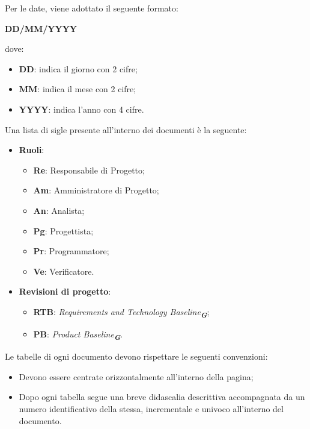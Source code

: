 Per le date, viene adottato il seguente formato:
\begin{center}
    \textbf{DD/MM/YYYY}
\end{center}
dove:
\begin{itemize}
    \item \textbf{DD}: indica il giorno con 2 cifre;
    \item \textbf{MM}: indica il mese con 2 cifre;
    \item \textbf{YYYY}: indica l’anno con 4 cifre.
\end{itemize}

Una lista di sigle presente all'interno dei documenti è la seguente:
\begin{itemize}
    \item \textbf{Ruoli}:
    \begin{itemize}
        \item \textbf{Re}: Responsabile di Progetto;
        \item \textbf{Am}: Amministratore di Progetto;
        \item \textbf{An}: Analista;
        \item \textbf{Pg}: Progettista;
        \item \textbf{Pr}: Programmatore;
        \item \textbf{Ve}: Verificatore.
    \end{itemize}
    \item \textbf{Revisioni di progetto}:
    \begin{itemize}
        \item \textbf{RTB}: \emph{Requirements and Technology Baseline}\textsubscript{\textit{\textbf{G}}};
        \item \textbf{PB}: \emph{Product Baseline}\textsubscript{\textit{\textbf{G}}}.
    \end{itemize}
\end{itemize}

Le tabelle di ogni documento devono rispettare le seguenti convenzioni:
\begin{itemize}
    \item Devono essere centrate orizzontalmente all’interno della pagina;
    \item Dopo ogni tabella segue una breve didascalia descrittiva accompagnata da un numero
    identificativo della stessa, incrementale e univoco all’interno del documento.
\end{itemize}


